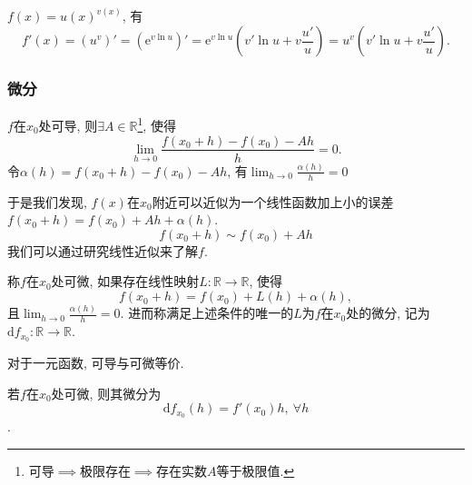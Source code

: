 \begin{example}
    $f\left( x \right) = u\left( x \right) ^{v\left( x \right) } $, 有
    \begin{equation}
      f'\left( x \right) = \left( u^{v} \right) ' = \left( \mathrm{e}^{v \ln u} \right) ' = \mathrm{e}^{v \ln u} \left( v' \ln u + v \frac{u'}{u} \right) = u^{v} \left( v' \ln u + v \frac{u'}{u} \right) .
    \end{equation}
\end{example}

\subsubsection{微分}
$f$在$x_0$处可导, 则$\exists A \in \mathbb{R}$\footnote{可导$\implies$极限存在$\implies$存在实数$A$等于极限值.}, 使得
\begin{equation}
  \lim_{h \to 0} \frac{f\left( x_0 + h \right) - f\left( x_0 \right) - Ah}{h} = 0.
\end{equation}
令$\alpha \left( h \right) = f\left( x_0 + h \right) - f\left( x_0 \right) - A h$, 有$\lim_{h \to 0} \frac{\alpha \left( h \right) }{h} = 0$

于是我们发现, $f\left( x \right) $在$x_0$附近可以近似为一个线性函数加上小的误差$f\left( x_0 + h \right) = f\left( x_0 \right) + Ah + \alpha\left( h \right) $.
\begin{equation}
  f\left( x_0 + h \right) \sim f\left( x_0 \right)  + Ah
\end{equation}
我们可以通过研究线性近似来了解$f$.

\begin{definition}[可微/微分]
    称$f$在$x_0$处可微, 如果存在线性映射$L\colon \mathbb{R} \to \mathbb{R}$, 使得
    \begin{equation}
      f\left( x_0 + h \right) = f\left( x_0 \right) + L\left( h \right) + \alpha\left( h \right) ,
    \end{equation}
    且$\displaystyle \lim_{h \to 0} \frac{\alpha\left( h \right) }{h} = 0$.
    进而称满足上述条件的唯一的$L$为$f$在$x_0$处的微分, 记为$\mathrm{d}f_{x_0}\colon \mathbb{R}\to \mathbb{R} $.
\end{definition}

\begin{proposition}
    对于一元函数, 可导与可微等价.

    若$f$在$x_0$处可微, 则其微分为
    \begin{equation}
      \mathrm{d} f_{x_0} \left( h \right) = f' \left( x_0 \right) h,\ \forall h
    \end{equation}.
\end{proposition}

